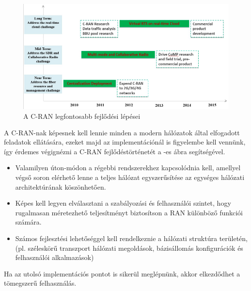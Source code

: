 \hspace{2mm}
\begin{figure}[!ht]
\centering
\includegraphics[width=\textwidth, keepaspectratio]{figures/timeline.png}
\caption{A C-RAN legfontosabb fejlődési lépései} 
\label{fig:timeline}
\end{figure} 

\indent A C-RAN-nak képesnek kell lennie minden a modern hálózatok által elfogadott feladatok ellátására, ezeket majd az implementációnál is figyelembe kell vennünk, így érdemes végignézni a C-RAN fejlődéstörténetét a -es ábra segítségével.
\begin{itemize}
\item Valamilyen úton-módon a régebbi rendszerekhez kapcsolódnia kell, amellyel végső soron elérhető lenne a teljes hálózat egyszerűsítése az egységes hálózati architektúrának köszönhetően.
\item Képes kell legyen elválasztani a szabályozási és felhasználói szintet, hogy rugalmasan méretezhető teljesítményt biztosítson a RAN különböző funkciói számára.
\item Számos fejlesztési lehetőséggel kell rendelkeznie a hálózati struktúra területén, (pl. széleskörű transzport hálózati megoldások, bázisállomás konfigurációk és felhasználói alkalmazások)
\end{itemize}
Ha az utolsó implementációs pontot is sikerül meglépnünk, akkor elkezdődhet a tömegszerű felhasználás.